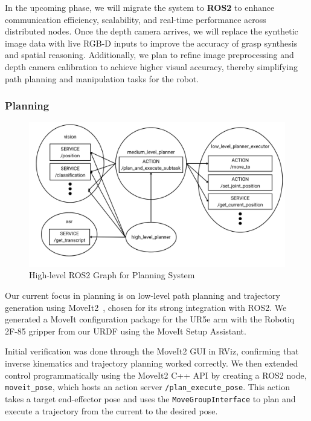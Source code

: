 \documentclass[12pt]{extarticle}
\begin{document}
In the upcoming phase, we will migrate the system to \textbf{ROS2} to enhance communication efficiency, scalability, and real-time performance across distributed nodes. Once the depth camera arrives, we will replace the synthetic image data with live RGB-D inputs to improve the accuracy of grasp synthesis and spatial reasoning. Additionally, we plan to refine image preprocessing and depth camera calibration to achieve higher visual accuracy, thereby simplifying path planning and manipulation tasks for the robot.


\subsubsection{Planning}

\begin{figure}[h]
    \centering
    \includegraphics[width=\linewidth]{images/ros2_graph.png}
    \caption{High-level ROS2 Graph for Planning System}
    \label{fig: ros2-graph}
\end{figure}

Our current focus in planning is on low-level path planning and trajectory generation using MoveIt2~\cite{moveit2}, chosen for its strong integration with ROS2. We generated a MoveIt configuration package for the UR5e arm with the Robotiq 2F-85 gripper from our URDF using the MoveIt Setup Assistant.

Initial verification was done through the MoveIt2 GUI in RViz, confirming that inverse kinematics and trajectory planning worked correctly. We then extended control programmatically using the MoveIt2 C++ API by creating a ROS2 node, \texttt{moveit\_pose}, which hosts an action server \texttt{/plan\_execute\_pose}. This action takes a target end-effector pose and uses the \texttt{MoveGroupInterface} to plan and execute a trajectory from the current to the desired pose.
\end{document}
